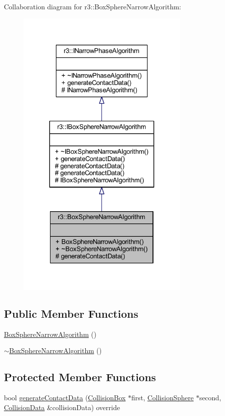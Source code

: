 Collaboration diagram for r3\+:\+:Box\+Sphere\+Narrow\+Algorithm\+:\nopagebreak
\begin{figure}[H]
\begin{center}
\leavevmode
\includegraphics[width=239pt]{classr3_1_1_box_sphere_narrow_algorithm__coll__graph}
\end{center}
\end{figure}
\subsection*{Public Member Functions}
\begin{DoxyCompactItemize}
\item 
\mbox{\hyperlink{classr3_1_1_box_sphere_narrow_algorithm_a0184c33ce7da891240781ad7c78bd9a2}{Box\+Sphere\+Narrow\+Algorithm}} ()
\item 
\mbox{\hyperlink{classr3_1_1_box_sphere_narrow_algorithm_ab00e17b38da83e9a159aa7786a7a1f95}{$\sim$\+Box\+Sphere\+Narrow\+Algorithm}} ()
\end{DoxyCompactItemize}
\subsection*{Protected Member Functions}
\begin{DoxyCompactItemize}
\item 
bool \mbox{\hyperlink{classr3_1_1_box_sphere_narrow_algorithm_a596ead483380185d32cf570eb189314c}{generate\+Contact\+Data}} (\mbox{\hyperlink{classr3_1_1_collision_box}{Collision\+Box}} $\ast$first, \mbox{\hyperlink{classr3_1_1_collision_sphere}{Collision\+Sphere}} $\ast$second, \mbox{\hyperlink{classr3_1_1_collision_data}{Collision\+Data}} \&collision\+Data) override
\end{DoxyCompactItemize}


